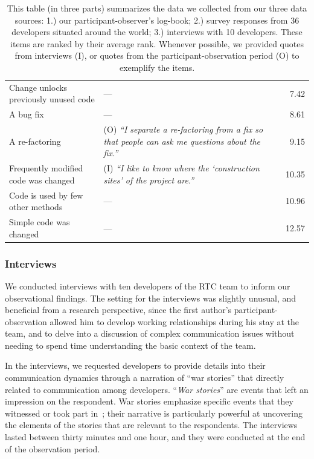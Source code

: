 \begin{table}[th!]
{\begin{tabular}{l@{\hspace{0pt}}l@{\hspace{-15pt}}r}
Change unlocks previously unused code &--- & 7.42\\%
A bug fix &--- & 8.61\\%
A re-factoring &(O) \emph{``I separate a re-factoring from a fix so that people can ask me questions about the fix.''}& 9.15\\%
Frequently modified code was changed &(I) \emph{``I like to know where the `construction sites' of the project are.''}& 10.35\\%
Code is used by few other methods &--- & 10.96\\%
Simple code was changed\phantom{abcdefgheabcdefghe} &--- & 12.57\\%
\bottomrule
\end{tabular}
\label{tab:sub-technical}
}
\vspace{-10pt}
\caption{This table (in three parts) summarizes the data we collected from our three data sources: 1.) our participant-observer's log-book; 2.) survey responses from 36 developers situated around the world; 3.) interviews with 10 developers.  These items are ranked by their average rank.  Whenever possible, we provided quotes from interviews (I), or quotes from the participant-observation period (O) to exemplify the items.}
\addtocounter{table}{-1}
\label{tab:surveyfactors}
\end{table}

\subsubsection{Interviews}

We conducted interviews with ten developers of the RTC team to inform our observational findings. The setting for the interviews was slightly unusual, and beneficial from a research perspective, since the first author's participant-observation allowed him to develop working relationships during his stay at the team, and to delve into a discussion of complex communication issues without needing to spend time understanding the basic context of the team.

In the interviews, we requested developers to provide details into their communication dynamics through a narration of ``war stories'' that directly related to communication among developers. ``\emph{War stories}'' are events that left an impression on the respondent. War stories emphasize specific events that they witnessed or took part in~\cite{lutters:ist:2007}; their narrative is particularly powerful at uncovering the elements of the stories that are relevant to the respondents. The interviews lasted between thirty minutes and one hour, and they were conducted at the end of the observation period. 


